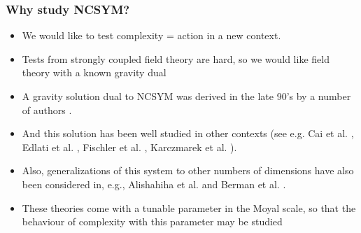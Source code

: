 \documentclass[8pt,aspectratio=169]{beamer}
\begin{document}
\begin{frame}
\frametitle{Why study NCSYM?}

\begin{itemize}

\item We would like to test complexity = action in a new context. 

\item Tests from strongly coupled field theory are hard, so we would like field theory with a known gravity dual

\item A gravity solution dual to NCSYM was derived in the late 90's by a number of authors \cite{Hashimoto:1999ut, Maldacena:1999mh}.

\item And this solution has been well studied in other contexts (see e.g. Cai et al. \cite{Cai:1999aw}, Edlati et al. \cite{Edalati:2012jj}, Fischler et al. \cite{Fischler:2013gsa}, Karczmarek et al. \cite{Karczmarek:2013xxa}).

\item Also, generalizations of this system to other numbers of dimensions have also been considered in, e.g., Alishahiha et al. \cite{Alishahiha:1999ci} and Berman et al. \cite{Berman:2000jw}.

\item These theories come with a tunable parameter in the Moyal scale, so that the behaviour of complexity with this parameter may be studied

\end{itemize}

\end{frame}
\end{document}
